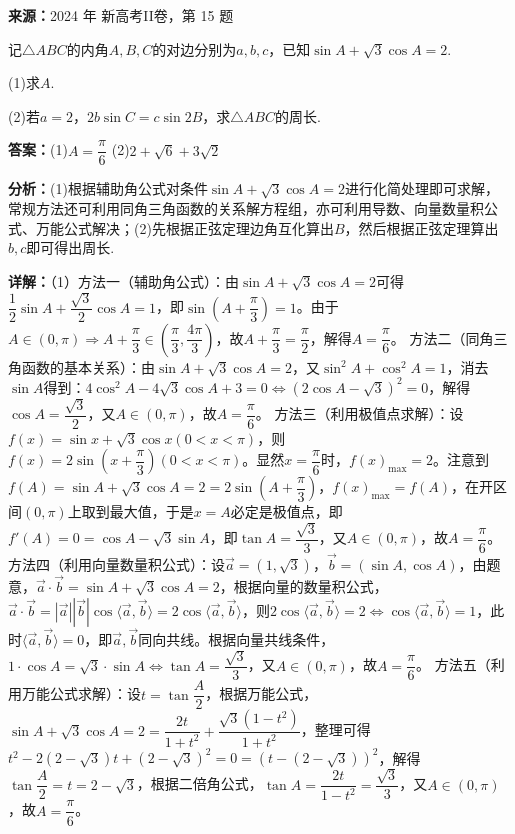 \begin{question}[points=15]
\textbf{来源：}2024 年 新高考II卷，第 15 题\par
记$\triangle ABC$的内角$A,B,C$的对边分别为$a,b,c$，已知$\sin A+\sqrt{3}\cos A=2$.

(1)求$A$.

(2)若$a=2$，$2b\sin C=c\sin 2B$，求$\triangle ABC$的周长.
\begin{solution}
\textbf{答案：}(1)$A=\dfrac{\pi}{6}$
(2)$2+\sqrt{6}+3\sqrt{2}$

\textbf{分析：}(1)根据辅助角公式对条件$\sin A+\sqrt{3}\cos A=2$进行化简处理即可求解，常规方法还可利用同角三角函数的关系解方程组，亦可利用导数、向量数量积公式、万能公式解决；(2)先根据正弦定理边角互化算出$B$，然后根据正弦定理算出$b,c$即可得出周长.

\textbf{详解：}（1）方法一（辅助角公式）：由$\sin A+\sqrt{3}\cos A=2$可得$\dfrac{1}{2}\sin A+\dfrac{\sqrt{3}}{2}\cos A=1$，即$\sin\left(A+\dfrac{\pi}{3}\right)=1$。由于$A\in(0,\pi)\Rightarrow A+\dfrac{\pi}{3}\in\left(\dfrac{\pi}{3},\dfrac{4\pi}{3}\right)$，故$A+\dfrac{\pi}{3}=\dfrac{\pi}{2}$，解得$A=\dfrac{\pi}{6}$。
方法二（同角三角函数的基本关系）：由$\sin A+\sqrt{3}\cos A=2$，又$\sin^2 A+\cos^2 A=1$，消去$\sin A$得到：$4\cos^2 A-4\sqrt{3}\cos A+3=0\Leftrightarrow(2\cos A-\sqrt{3})^2=0$，解得$\cos A=\dfrac{\sqrt{3}}{2}$，又$A\in(0,\pi)$，故$A=\dfrac{\pi}{6}$。
方法三（利用极值点求解）：设$f(x)=\sin x+\sqrt{3}\cos x(0<x<\pi)$，则$f(x)=2\sin\left(x+\dfrac{\pi}{3}\right)(0<x<\pi)$。显然$x=\dfrac{\pi}{6}$时，$f(x)_{\max}=2$。注意到$f(A)=\sin A+\sqrt{3}\cos A=2=2\sin\left(A+\dfrac{\pi}{3}\right)$，$f(x)_{\max}=f(A)$，在开区间$(0,\pi)$上取到最大值，于是$x=A$必定是极值点，即$f'(A)=0=\cos A-\sqrt{3}\sin A$，即$\tan A=\dfrac{\sqrt{3}}{3}$，又$A\in(0,\pi)$，故$A=\dfrac{\pi}{6}$。
方法四（利用向量数量积公式）：设$\vec{a}=(1,\sqrt{3})$，$\vec{b}=(\sin A,\cos A)$，由题意，$\vec{a}\cdot\vec{b}=\sin A+\sqrt{3}\cos A=2$，根据向量的数量积公式，$\vec{a}\cdot\vec{b}=|\vec{a}||\vec{b}|\cos\langle\vec{a},\vec{b}\rangle=2\cos\langle\vec{a},\vec{b}\rangle$，则$2\cos\langle\vec{a},\vec{b}\rangle=2\Leftrightarrow\cos\langle\vec{a},\vec{b}\rangle=1$，此时$\langle\vec{a},\vec{b}\rangle=0$，即$\vec{a},\vec{b}$同向共线。根据向量共线条件，$1\cdot\cos A=\sqrt{3}\cdot\sin A\Leftrightarrow\tan A=\dfrac{\sqrt{3}}{3}$，又$A\in(0,\pi)$，故$A=\dfrac{\pi}{6}$。
方法五（利用万能公式求解）：设$t=\tan\dfrac{A}{2}$，根据万能公式，$\sin A+\sqrt{3}\cos A=2=\dfrac{2t}{1+t^2}+\dfrac{\sqrt{3}(1-t^2)}{1+t^2}$，整理可得$t^2-2(2-\sqrt{3})t+(2-\sqrt{3})^2=0=(t-(2-\sqrt{3}))^2$，解得$\tan\dfrac{A}{2}=t=2-\sqrt{3}$，根据二倍角公式，$\tan A=\dfrac{2t}{1-t^2}=\dfrac{\sqrt{3}}{3}$，又$A\in(0,\pi)$，故$A=\dfrac{\pi}{6}$。

\end{solution}
\end{question}
